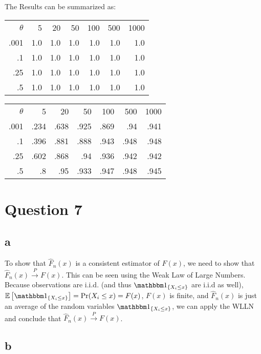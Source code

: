 \documentclass[12pt]{paper}
\begin{document}
The Results can be summarized as: 

\begin{center}
\begin{tabular}{rrrrrrr}
\(\theta\) & 5 & 20 & 50 & 100 & 500 & 1000\\
.001 & 1.0 & 1.0 & 1.0 & 1.0 & 1.0 & 1.0\\
.1 & 1.0 & 1.0 & 1.0 & 1.0 & 1.0 & 1.0\\
.25 & 1.0 & 1.0 & 1.0 & 1.0 & 1.0 & 1.0\\
.5 & 1.0 & 1.0 & 1.0 & 1.0 & 1.0 & 1.0\\
\end{tabular}
\end{center}

\begin{center}
\begin{tabular}{rrrrrrr}
\(\theta\) & 5 & 20 & 50 & 100 & 500 & 1000\\
.001 & .234 & .638 & .925 & .869 & .94 & .941\\
.1 & .396 & .881 & .888 & .943 & .948 & .948\\
.25 & .602 & .868 & .94 & .936 & .942 & .942\\
.5 & .8 & .95 & .933 & .947 & .948 & .945\\
\end{tabular}
\end{center}

\section*{Question 7}

\subsection*{a} 

To show that $\hat{F}_n(x)$ is a consistent estimator of $F(x)$, we need to show that $\hat{F}_n(x)\overset{P}{\to}F(x)$. This can be seen using the Weak Law of Large Numbers. Because observations are i.i.d. (and thus $\indicate{X_i\le x}$ are i.i.d as well), $\exV{\indicate{X_i\le x}}=\Pr(X_i\le x)=F(x)$, $F(x)$ is finite, and $\hat{F}_n(x)$ is just an average of the random variables $\indicate{X_i\le x}$, we can apply the WLLN and conclude that $\hat{F}_n(x)\overset{P}{\to}F(x)$.

\subsection*{b} 
\end{document}
